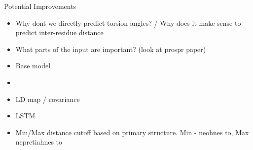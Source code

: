 \documentclass{article}
\begin{document}
\begin{Huge}
    Potential Improvements
\end{Huge}

\begin{itemize}
    \item Why dont we directly predict torsion angles? / Why does it make sense to predict inter-residue distance
    \item What parts of the input are important? (look at prospr paper)
    \item Base model
    \item 
    \item LD map / covariance
    \item LSTM
    \item Min/Max distance cutoff based on primary structure. Min - neohnes to, Max nepretiahnes to
\end{itemize}
\end{document}
